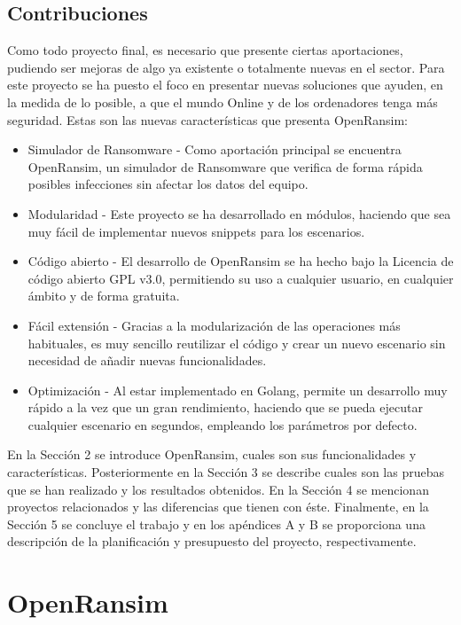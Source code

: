 \documentclass[a4paper,12pt]{article}
\begin{document}
\subsection{Contribuciones}
Como todo proyecto final, es necesario que presente ciertas aportaciones, pudiendo ser mejoras de algo ya existente o totalmente nuevas en el sector. Para este proyecto se ha puesto el foco en presentar nuevas soluciones que ayuden, en la medida de lo posible, a que el mundo Online y de los ordenadores tenga más seguridad. Estas son las nuevas características que presenta OpenRansim: 
\begin{itemize}
	\item Simulador de Ransomware - Como aportación principal se encuentra OpenRansim, un simulador de Ransomware que verifica de forma rápida posibles infecciones sin afectar los datos del equipo.
	\item Modularidad - Este proyecto se ha desarrollado en módulos, haciendo que sea muy fácil de implementar nuevos snippets para los escenarios.
	\item Código abierto - El desarrollo de OpenRansim se ha hecho bajo la Licencia de código abierto GPL v3.0, permitiendo su uso a cualquier usuario, en cualquier ámbito y de forma gratuita.
	\item Fácil extensión - Gracias a la modularización de las operaciones más habituales, es muy sencillo reutilizar el código y crear un nuevo escenario sin necesidad de añadir nuevas funcionalidades.
	\item Optimización - Al estar implementado en Golang, permite un desarrollo muy rápido a la vez que un gran rendimiento, haciendo que se pueda ejecutar cualquier escenario en segundos, empleando los parámetros por defecto.
\end{itemize}
En la Sección 2 se introduce OpenRansim, cuales son sus funcionalidades y características. Posteriormente en la Sección 3 se describe cuales son las pruebas que se han realizado y los resultados obtenidos. En la Sección 4 se mencionan proyectos relacionados y las diferencias que tienen con éste. Finalmente, en la Sección 5 se concluye el trabajo y en los apéndices A y B se proporciona una descripción de la planificación y presupuesto del proyecto, respectivamente.
\newpage
\section{OpenRansim}
\end{document}
